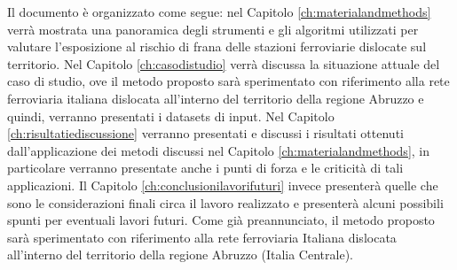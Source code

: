 Il documento è organizzato come segue: nel Capitolo \ref{ch:materialandmethods} verrà mostrata una panoramica degli strumenti e gli algoritmi utilizzati per valutare l’esposizione al rischio di frana delle stazioni ferroviarie dislocate sul territorio. Nel Capitolo \ref{ch:casodistudio} verrà discussa la situazione attuale del caso di studio, ove il metodo proposto sarà sperimentato con riferimento alla rete ferroviaria italiana dislocata all'interno del territorio della regione Abruzzo e quindi, verranno presentati i datasets di input. Nel Capitolo \ref{ch:risultatiediscussione} verranno presentati e discussi i risultati ottenuti dall'applicazione dei metodi discussi nel Capitolo \ref{ch:materialandmethods}, in particolare verranno presentate anche i punti di forza e le criticità di tali applicazioni. Il Capitolo \ref{ch:conclusionilavorifuturi} invece presenterà quelle che sono le considerazioni finali circa il lavoro realizzato e presenterà alcuni possibili spunti per eventuali lavori futuri. 
\newline
\newline
Come già preannunciato, il metodo proposto sarà sperimentato con riferimento alla rete ferroviaria Italiana dislocata all'interno del territorio della regione Abruzzo (Italia Centrale).